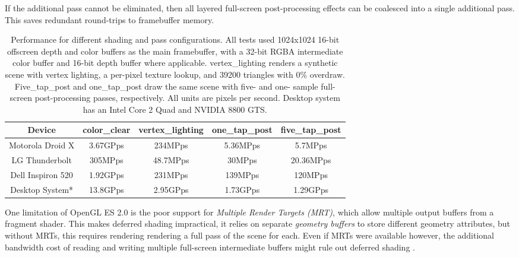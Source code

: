 If the additional pass cannot be eliminated, then all layered full-screen
post-processing effects can be coalesced into a single additional pass.  This
saves redundant round-trips to framebuffer memory.

\begin{table}[htb]\centering \begin{tabular}{|c||c|c|c|c|} 
\hline \small{Device} & \small{color\_clear} & \small{vertex\_lighting} & \small{one\_tap\_post} & \small{five\_tap\_post}  \\ \hline 
\hline \small{Motorola Droid X} & \small{3.67GPps} & \small{234MPps}& \small{5.36MPps\footnotemark[1]} & \small{5.7MPps\footnotemark[1]} \\ 
\hline \small{LG Thunderbolt} & \small{305MPps} & \small{48.7MPps}& \small{30MPps} & \small{20.36MPps} \\ 
\hline \small{Dell Inspiron 520} & \small{1.92GPps} & \small{231MPps}& \small{139MPps} & \small{120MPps} \\ 
\hline \small{Desktop System*} & \small{13.8GPps} & \small{2.95GPps}& \small{1.73GPps} & \small{1.29GPps} \\ 
\hline
\end{tabular} 
\caption{Performance for different shading and pass configurations.  All tests used 1024x1024 16-bit offscreen depth and color buffers as the main framebuffer, with a 32-bit RGBA intermediate color buffer and 16-bit depth buffer where applicable.  vertex\_lighting renders a synthetic scene with vertex lighting, a per-pixel texture lookup, and 39200 triangles with 0\% overdraw.  Five\_tap\_post and one\_tap\_post draw the same scene with five- and one- sample full-screen post-processing passes, respectively.  All units are pixels per second.  Desktop system has an Intel Core 2 Quad and NVIDIA 8800 GTS.}
\label{JonMcCaffrey:pass_performance} \end{table}


One limitation of OpenGL ES 2.0 is the poor support for \textit{Multiple Render
Targets (MRT)}, which allow multiple output buffers from a fragment shader.
This makes deferred shading impractical, it relies on separate \textit{geometry
buffers} to store different geometry attributes, but without MRTs, this
requires rendering rendering a full pass of the scene for each.  Even if MRTs
were available however, the additional bandwidth cost of reading and writing
multiple full-screen intermediate buffers might rule out deferred shading .

